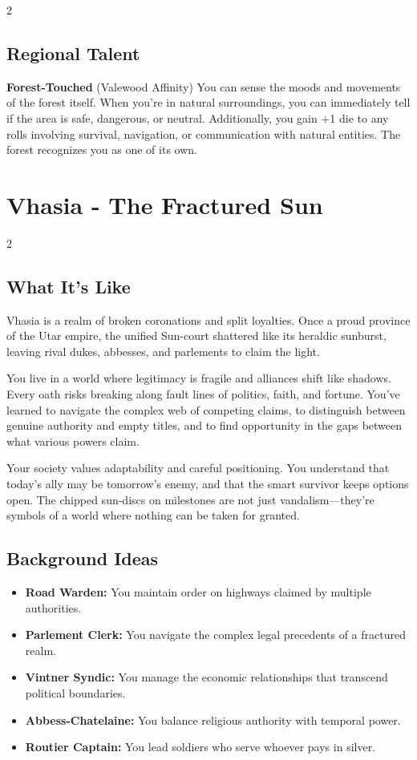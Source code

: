 \documentclass[11pt]{article}
\newcommand{\region}[1]{\section*{#1}}
\newcommand{\subregion}[1]{\subsection*{#1}}
\begin{document}
\begin{multicols}{2}
\subregion{Regional Talent}

\textbf{Forest-Touched} (Valewood Affinity)
You can sense the moods and movements of the forest itself. When you're in natural surroundings, you can immediately tell if the area is safe, dangerous, or neutral. Additionally, you gain +1 die to any rolls involving survival, navigation, or communication with natural entities. The forest recognizes you as one of its own.

\end{multicols}

\region{Vhasia - The Fractured Sun}

\begin{multicols}{2}
\subregion{What It's Like}

Vhasia is a realm of broken coronations and split loyalties. Once a proud province of the Utar empire, the unified Sun-court shattered like its heraldic sunburst, leaving rival dukes, abbesses, and parlements to claim the light.

You live in a world where legitimacy is fragile and alliances shift like shadows. Every oath risks breaking along fault lines of politics, faith, and fortune. You've learned to navigate the complex web of competing claims, to distinguish between genuine authority and empty titles, and to find opportunity in the gaps between what various powers claim.

Your society values adaptability and careful positioning. You understand that today's ally may be tomorrow's enemy, and that the smart survivor keeps options open. The chipped sun-discs on milestones are not just vandalism---they're symbols of a world where nothing can be taken for granted.

\columnbreak

\subregion{Background Ideas}

\begin{itemize}[leftmargin=*]
    \item \textbf{Road Warden:} You maintain order on highways claimed by multiple authorities.
    \item \textbf{Parlement Clerk:} You navigate the complex legal precedents of a fractured realm.
    \item \textbf{Vintner Syndic:} You manage the economic relationships that transcend political boundaries.
    \item \textbf{Abbess-Chatelaine:} You balance religious authority with temporal power.
    \item \textbf{Routier Captain:} You lead soldiers who serve whoever pays in silver.
\end{itemize}


\end{multicols}
\end{document}
